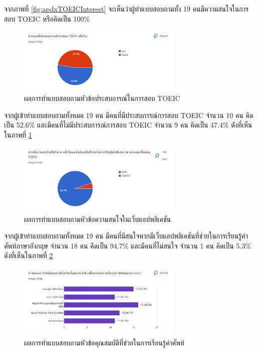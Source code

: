 \documentclass[12pt,oneside,openright,a4paper]{cpe-thai-project}
\begin{document}
\hspace{1cm}
จากภาพที่ \ref{fig:apdxTOEICInterest} จะเห็นว่าผู้ทำแบบสอบถามทั้ง 19 คนมีความสนใจในการสอบ TOEIC หรือคิดเป็น 100\%

\begin{figure}[!h]\centering
	\includegraphics[width=0.7\textwidth, keepaspectratio=true]{image/appendix/1st/exp.png}
	\caption{{ผลการทำแบบสอบถามหัวข้อประสบการณ์ในการสอบ TOEIC}}\label{fig:apdxTOEICEXP}
\end{figure}

\hspace{1cm}
จากผู้เข้าทำแบบสอบถามทั้งหมด 19 คน มีคนที่มีประสบการณ์การสอบ TOEIC จำนวน 10 คน คิดเป็น 52.6\%
และมีคนที่ไม่มีประสบการณ์การสอบ TOEIC จำนวน 9 คน คิดเป็น 47.4\% ดังที่เห็นในภาพที่ \ref{fig:apdxTOEICEXP}

\pagebreak
{}
\begin{figure}[!h]\centering
	\includegraphics[width=0.7\textwidth, keepaspectratio=true]{image/appendix/1st/app interest.png}
	\caption{{ผลการทำแบบสอบถามหัวข้อความสนใจในเว็บแอปพลิเคชัน}}\label{fig:apdxAPPInterest}
\end{figure}

\hspace{1cm}
จากผู้เข้าทำแบบสอบถามทั้งหมด 19 คน มีคนที่มีสนใจหากมีเว็บแอปพลิเคชันที่ช่วยในการเรียนรู้คำศัพท์ภาษาอังกฤษ จำนวน 18 คน คิดเป็น 94.7\%
และมีคนที่ไม่สนใจ จำนวน 1 คน คิดเป็น 5.3\% ดังที่เห็นในภาพที่ \ref{fig:apdxAPPInterest}

\pagebreak
{}
\begin{figure}[!h]\centering
	\includegraphics[width=0.7\textwidth, keepaspectratio=true]{image/appendix/1st/feature 1.png}
	\caption{{ผลการทำแบบสอบถามหัวข้อคุณสมบัติที่ช่วยในการเรียนรู้คำศัพท์}}\label{fig:apdxFeature1}
\end{figure}
\end{document}
